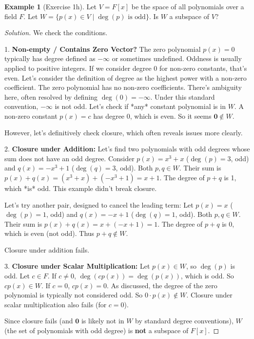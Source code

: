 \documentclass[11pt]{article}
\theoremstyle{definition}
\newtheorem{example}[theorem]{Example}
\theoremstyle{remark}
\newcommand{\zerovec}{\mathbf{0}}
\begin{document}
\begin{example}[Exercise 1h]
Let $V = F[x]$ be the space of all polynomials over a field $F$. Let $W = \{ p(x) \in V \mid \deg(p) \text{ is odd} \}$. Is $W$ a subspace of $V$?

\begin{proof}[Solution]
We check the conditions.

1.  \textbf{Non-empty / Contains Zero Vector?} The zero polynomial $p(x)=0$ typically has degree defined as $-\infty$ or sometimes undefined. Oddness is usually applied to positive integers. If we consider degree 0 for non-zero constants, that's even. Let's consider the definition of degree as the highest power with a non-zero coefficient. The zero polynomial has no non-zero coefficients. There's ambiguity here, often resolved by defining $\deg(0) = -\infty$. Under this standard convention, $-\infty$ is not odd. Let's check if *any* constant polynomial is in $W$. A non-zero constant $p(x)=c$ has degree 0, which is even. So it seems $\zerovec \notin W$.

    However, let's definitively check closure, which often reveals issues more clearly.

2.  \textbf{Closure under Addition:} Let's find two polynomials with odd degrees whose sum does not have an odd degree.
    Consider $p(x) = x^3 + x$ ($\deg(p)=3$, odd) and $q(x) = -x^3 + 1$ ($\deg(q)=3$, odd). Both $p, q \in W$.
    Their sum is $p(x) + q(x) = (x^3+x) + (-x^3+1) = x+1$.
    The degree of $p+q$ is 1, which *is* odd. This example didn't break closure.

    Let's try another pair, designed to cancel the leading term:
    Let $p(x) = x$ ($\deg(p)=1$, odd) and $q(x) = -x+1$ ($\deg(q)=1$, odd). Both $p, q \in W$.
    Their sum is $p(x) + q(x) = x + (-x+1) = 1$.
    The degree of $p+q$ is 0, which is even (not odd). Thus $p+q \notin W$.

    Closure under addition fails.

3.  \textbf{Closure under Scalar Multiplication:} Let $p(x) \in W$, so $\deg(p)$ is odd. Let $c \in F$.
    If $c \neq 0$, $\deg(c p(x)) = \deg(p(x))$, which is odd. So $c p(x) \in W$.
    If $c=0$, $c p(x) = 0$. As discussed, the degree of the zero polynomial is typically not considered odd. So $0 \cdot p(x) \notin W$.
    Closure under scalar multiplication also fails (for $c=0$).

Since closure fails (and $\zerovec$ is likely not in $W$ by standard degree conventions), $W$ (the set of polynomials with odd degree) is \textbf{not} a subspace of $F[x]$.
\end{proof}
\end{example}
\end{document}
